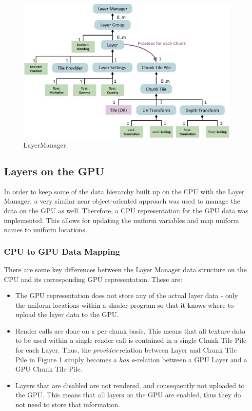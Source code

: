 \begin{figure}[htbp]
    \centering
    \includegraphics[width=\textwidth]{figures/implementation/layers/layermanager.pdf}
    \caption{LayerManager.}
    \label{fig:layermanager}
\end{figure}

\subsection{Layers on the GPU}

In order to keep some of the data hierarchy built up on the CPU with the Layer Manager, a very similar near object-oriented approach was used to manage the data on the GPU as well. Therefore, a CPU representation for the GPU data was implemented. This allows for  updating the uniform variables and map uniform names to uniform locations.

\subsubsection{CPU to GPU Data Mapping}

There are some key differences between the Layer Manager data structure on the CPU and its corresponding GPU representation. These are:

\begin{itemize}
\item The GPU representation does not store any of the actual layer data - only the uniform locations within a shader program so that it knows where to upload the layer data to the GPU. 
\item Render calls are done on a per chunk basis. This means that all texture data to be used within a single render call is contained in a single Chunk Tile Pile for each Layer. Thus, the \emph{provides}-relation between Layer and Chunk Tile Pile in Figure \ref{fig:layermanager} simply becomes a \emph{has a}-relation between a GPU Layer and a GPU Chunk Tile Pile.
\item Layers that are disabled are not rendered, and consequently not uploaded to the GPU. This means that all layers on the GPU are enabled, thus they do not need to store that information.
\end{itemize}

